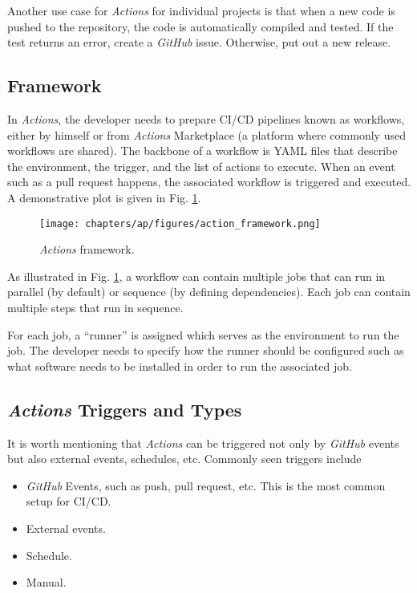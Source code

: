 Another use case for \textit{Actions} for individual projects is that when a new code is pushed to the repository, the code is automatically compiled and tested. If the test returns an error, create a \textit{GitHub} issue. Otherwise, put out a new release.

\subsection{Framework}

In \textit{Actions}, the developer needs to prepare CI/CD pipelines known as workflows, either by himself or from \textit{Actions} Marketplace (a platform where commonly used workflows are shared). The backbone of a workflow is YAML files that describe the environment, the trigger, and the list of actions to execute. When an event such as a pull request happens, the associated workflow is triggered and executed. A demonstrative plot is given in Fig. \ref{ch:cicd:fig:actionframework}.
\begin{figure}[htbp]
	\centering
	\texttt{[image: chapters/ap/figures/action\_framework.png]}
	\caption{\textit{Actions} framework.} \label{ch:cicd:fig:actionframework}
\end{figure}

As illustrated in Fig. \ref{ch:cicd:fig:actionframework}, a workflow can contain multiple jobs that can run in parallel (by default) or sequence (by defining dependencies). Each job can contain multiple steps that run in sequence.

For each job, a ``runner'' is assigned which serves as the environment to run the job. The developer needs to specify how the runner should be configured such as what software needs to be installed in order to run the associated job.

\subsection{\textit{Actions} Triggers and Types}

It is worth mentioning that \textit{Actions} can be triggered not only by \textit{GitHub} events but also external events, schedules, etc. Commonly seen triggers include
\begin{itemize}
	\item \textit{GitHub} Events, such as push, pull request, etc. This is the most common setup for CI/CD.
	\item External events.
	\item Schedule.
	\item Manual.
\end{itemize}

